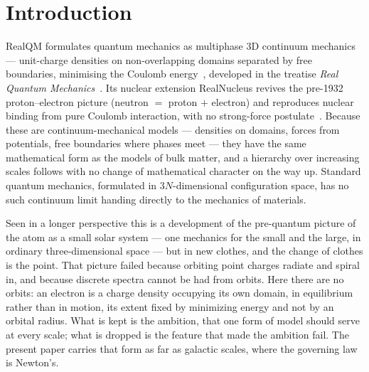 \documentclass[11pt]{article}
\begin{document}
\section{Introduction}
RealQM formulates quantum mechanics as multiphase 3D continuum mechanics --- unit-charge densities on
non-overlapping domains separated by free boundaries, minimising the Coulomb energy~\cite{realqm}, developed in the
treatise \emph{Real Quantum Mechanics}~\cite{realqmbook}. Its nuclear extension RealNucleus revives the pre-1932
proton--electron picture (neutron $=$ proton $+$ electron) and reproduces nuclear binding from pure Coulomb
interaction, with no strong-force postulate~\cite{realnucleus}. Because these are continuum-mechanical models ---
densities on domains, forces from potentials, free boundaries where phases meet --- they have the same
mathematical form as the models of bulk matter, and a hierarchy over increasing scales follows with no change of
mathematical character on the way up. Standard quantum mechanics, formulated in $3N$-dimensional configuration
space, has no such continuum limit handing directly to the mechanics of materials.

Seen in a longer perspective this is a development of the pre-quantum picture of the atom as a small solar system
--- one mechanics for the small and the large, in ordinary three-dimensional space --- but in new clothes, and the
change of clothes is the point. That picture failed because orbiting point charges radiate and spiral in, and
because discrete spectra cannot be had from orbits. Here there are no orbits: an electron is a charge density
occupying its own domain, in equilibrium rather than in motion, its extent fixed by minimizing energy and not by
an orbital radius. What is kept is the ambition, that one form of model should serve at every scale; what is
dropped is the feature that made the ambition fail. The present paper carries that form as far as galactic scales,
where the governing law is Newton's.
\end{document}
